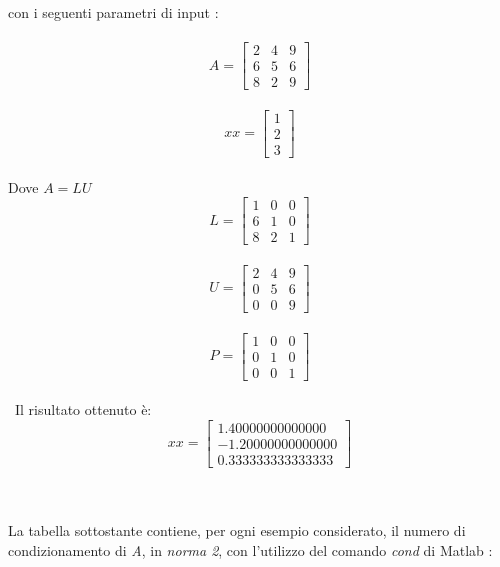 \begin{description}
	con i seguenti parametri di input :\\\	  
	\[
	A =\begin{bmatrix}
		2 & 4 & 9 \\ 
		6 & 5 & 6 \\
		8 & 2 & 9 
	\end{bmatrix}
	\]\\
	\[
	xx =\begin{bmatrix}
		1 \\
		2 \\
		3 
	\end{bmatrix}
	\]\\
	Dove $A = LU$\\ 
	\[
	L =\begin{bmatrix}
		1 & 0 & 0 \\ 
		6 & 1 & 0 \\
		8 & 2 & 1 
	\end{bmatrix}
	\]\\ 
	\[
	U =\begin{bmatrix}
		2 & 4 & 9 \\ 
		0 & 5 & 6 \\
		0 & 0 & 9 
	\end{bmatrix}
	\]\\ 
	\[
	P =\begin{bmatrix}
		1 & 0 & 0 \\ 
		0 & 1 & 0 \\
		0 & 0 & 1 
	\end{bmatrix}
	\]\\\
	Il risultato ottenuto è:\\
	\[
	xx =\begin{bmatrix}
		1.40000000000000  \\
		-1.20000000000000 \\
		0.333333333333333 
	\end{bmatrix}
	\]\\\\
\end{description}
La tabella sottostante contiene, per ogni esempio considerato, il numero di condizionamento di \textit{A}, in \textit{norma 2}, con l'utilizzo del comando \textit{cond} di Matlab :\\\
